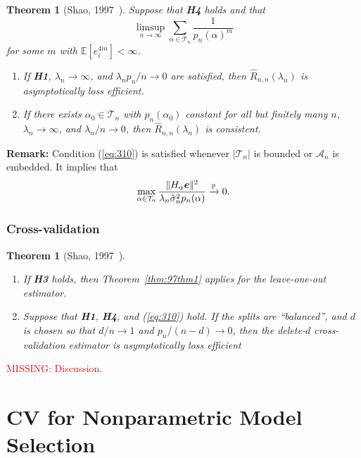 \documentclass[12pt, letter paper]{article}
\newcommand{\1}{\mathmybb{1}}
\newtheorem{theorem}[proposition]{Theorem}
\newcommand{\0}{\emptyset}
\newcommand{\prob}{\mathbb{P}}
\newcommand{\Ep}[1]{\mathbb{E}\left[ #1 \right]}
\newcommand{\paren}[1]{\left(#1 \right)}
\newcommand{\norm}[1]{|\hspace{-1pt}|#1 |\hspace{-1pt}|}
\newcommand{\normsq}[1]{\norm{#1}^{2}}
\newcommand{\Acal}{\mathcal{A}_{n}}
\newcommand{\Tcal}{\mathcal{T}_{n}}
\newcommand{\e}{\boldsymbol{e}}
\newcommand{\Rhat}[2]{\hat{R}_{n, #1}\paren{#2}}
\newcommand{\sigmahat}{\hat{\sigma}^{2}_{n}}
\begin{document}
\begin{theorem}[Shao, 1997~\cite{shao_1997}]\label{thm:97thm2}
    Suppose that \textbf{H4} holds and that
    \begin{equation}\label{eq:310}
        \limsup_{n\to\infty}\sum_{\alpha\in\Tcal}\frac{1}{p_{n}{(\alpha)}^{m}}
    \end{equation}
    for some \(m\) with \(\Ep{e_{i}^{4m}}<\infty\).
    \begin{enumerate}
        \item If \textbf{H1}, \(\lambda_{n}\to\infty\), and \(\lambda_{n}p_{n}/n \to 0\) are satisfied, then \(\Rhat{n}{\lambda_{n}}\) is asymptotically loss efficient.
        \item If there exists \(\alpha_{0}\in\Tcal\) with \(p_{n}(\alpha_{0})\) constant for all but finitely many \(n\), \(\lambda_{n}\to\infty\), and \(\lambda_{n}/n\to 0\), then \(\Rhat{n}{\lambda_{n}}\) is consistent. 
    \end{enumerate}
\end{theorem}

\textbf{Remark:} Condition (\ref{eq:310}) is satisfied whenever \(|\Tcal|\) is bounded or \(\Acal\) is embedded. It implies that 
\[ \max_{\alpha\in\Tcal} \frac{\normsq{H_{\alpha}\e}}{\lambda_{n}\sigmahat p_{n}(\alpha)}\xrightarrow{\prob} 0.\]

\subsubsection{Cross-validation}

\begin{theorem}[Shao, 1997~\cite{shao_1997}]\label{thm:97thm45}
    \begin{enumerate}
        \item If \textbf{H3} holds, then Theorem~\ref{thm:97thm1} applies for the leave-one-out estimator.
        \item Suppose that \textbf{H1}, \textbf{H4}, and (\ref{eq:310}) hold. If the splits are ``balanced'', and \(d\) is chosen so that \(d/n\to1\) and \(p_n/(n-d) \to 0\), then the delete-\(d\) cross-validation estimator is asymptotically loss efficient 
    \end{enumerate}
\end{theorem}

\textcolor{red}{MISSING: Discussion.}


\section{CV for Nonparametric Model Selection}
\end{document}
